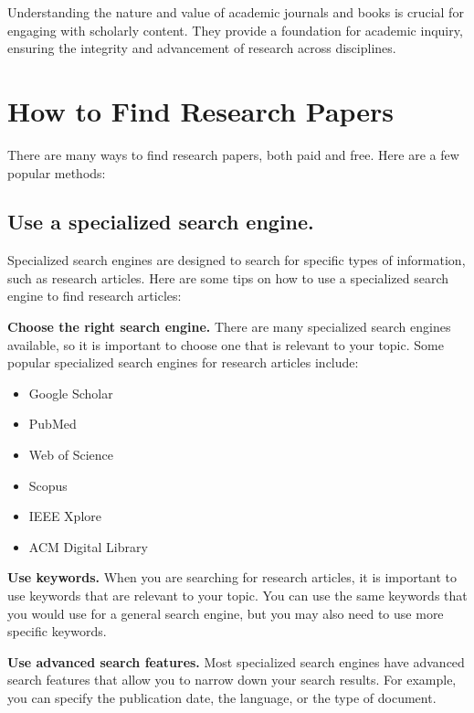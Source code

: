 \documentclass[
]{book}
\begin{document}
Understanding the nature and value of academic journals and books is crucial for engaging with scholarly content. They provide a foundation for academic inquiry, ensuring the integrity and advancement of research across disciplines.

\hypertarget{how-to-find-research-papers}{%
\section*{How to Find Research Papers}\label{how-to-find-research-papers}}

There are many ways to find research papers, both paid and free. Here are a few popular methods:

\hypertarget{use-a-specialized-search-engine.}{%
\subsection*{Use a specialized search engine.}\label{use-a-specialized-search-engine.}}

Specialized search engines are designed to search for specific types of information, such as research articles. Here are some tips on how to use a specialized search engine to find research articles:

\textbf{Choose the right search engine.} There are many specialized search engines available, so it is important to choose one that is relevant to your topic. Some popular specialized search engines for research articles include:

\begin{itemize}
\item
  Google Scholar
\item
  PubMed
\item
  Web of Science
\item
  Scopus
\item
  IEEE Xplore
\item
  ACM Digital Library
\end{itemize}

\textbf{Use keywords.} When you are searching for research articles, it is important to use keywords that are relevant to your topic. You can use the same keywords that you would use for a general search engine, but you may also need to use more specific keywords.

\textbf{Use advanced search features.} Most specialized search engines have advanced search features that allow you to narrow down your search results. For example, you can specify the publication date, the language, or the type of document.
\end{document}
